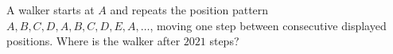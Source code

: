 A walker starts at $A$ and repeats the position pattern $A,B,C,D,A,B,C,D,E,A,\ldots$, moving one step between consecutive displayed positions. Where is the walker after $2021$ steps?
